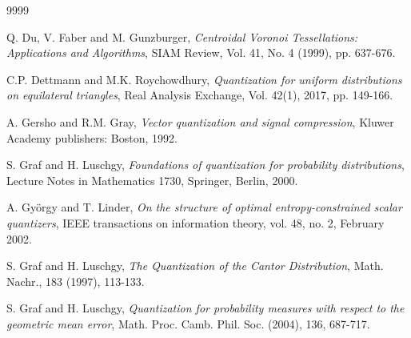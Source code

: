 \documentclass[12pt, reqno]{amsart}
\theoremstyle{plain}
\theoremstyle{definition}
\begin{document}
\begin{thebibliography}{9999}


   Q. Du, V. Faber and M. Gunzburger, \emph{Centroidal Voronoi Tessellations: Applications and Algorithms}, SIAM Review, Vol. 41, No. 4 (1999), pp. 637-676.

 C.P. Dettmann and M.K. Roychowdhury, \emph{Quantization for uniform distributions on equilateral triangles}, Real Analysis Exchange, Vol. 42(1), 2017, pp. 149-166.

 A. Gersho and R.M. Gray, \emph{Vector quantization and signal compression}, Kluwer Academy publishers: Boston, 1992.


 S. Graf and H. Luschgy, \emph{Foundations of quantization for probability distributions}, Lecture Notes in Mathematics 1730, Springer, Berlin, 2000.


 A. Gy\"orgy and T. Linder, \emph{On the structure of optimal entropy-constrained scalar quantizers},  IEEE transactions on information theory, vol. 48, no. 2, February 2002.

 S. Graf and H. Luschgy, \emph{The Quantization of the Cantor Distribution}, Math. Nachr., 183 (1997), 113-133.


 S. Graf and H. Luschgy, \emph{Quantization for probability measures with respect to the geometric mean error}, Math. Proc. Camb. Phil. Soc. (2004), 136, 687-717. 




\end{thebibliography}
\end{document}
